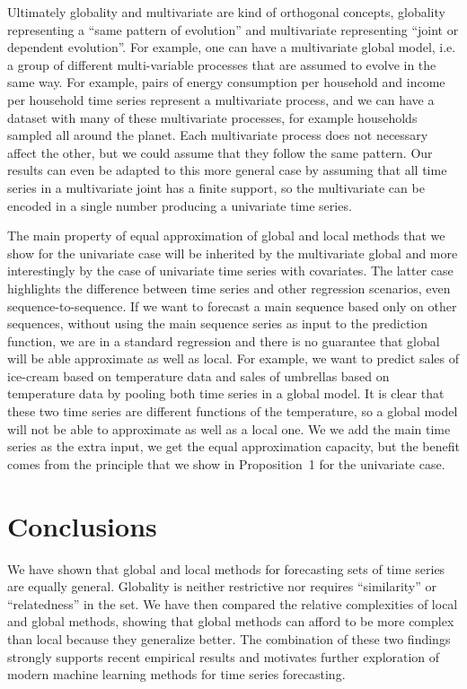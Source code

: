 \documentclass[a4paper]{article}
\theoremstyle{custom}
\begin{document}
Ultimately globality and multivariate are kind of orthogonal concepts, globality representing a ``same pattern of evolution'' and multivariate representing ``joint or dependent evolution''. For example, one can have a multivariate global model, i.e. a group of different multi-variable processes that are assumed to evolve in the same way. For example, pairs of energy consumption per household and income per household time series represent a multivariate process, and we can have a dataset with many of these multivariate processes, for example households sampled all around the planet. Each multivariate process does not necessary affect the other, but we could assume that they follow the same pattern. Our results can even be adapted to this more general case by assuming that all time series in a multivariate joint has a finite support, so the multivariate can be encoded in a single number producing a univariate time series.

The main property of equal approximation of global and local methods that we show for the univariate case will be inherited by the multivariate global and more interestingly by the case of univariate time series with covariates. The latter case highlights the difference between time series and other regression scenarios, even sequence-to-sequence. If we want to forecast a main sequence based only on other sequences, without using the main sequence series as input to the prediction function, we are in a standard regression and there is no guarantee that global will be able approximate as well as local. For example, we want to predict sales of ice-cream based on temperature data and sales of umbrellas based on temperature data by pooling both time series in a global model. It is clear that these two time series are different functions of the temperature, so a global model will not be able to approximate as well as a local one. We we add the main time series as the extra input, we get the equal approximation capacity, but the benefit comes from the principle that we show in Proposition~1 for the univariate case.

\section{Conclusions}

We have shown that global and local methods for forecasting sets of time series are equally general. Globality is neither restrictive nor requires ``similarity'' or ``relatedness'' in the set. We have then compared the relative complexities of local and global methods, showing that global methods can afford to be more complex than local because they generalize better.
The combination of these two findings strongly supports recent empirical results and motivates further exploration of modern machine learning methods for time series forecasting.
\end{document}
